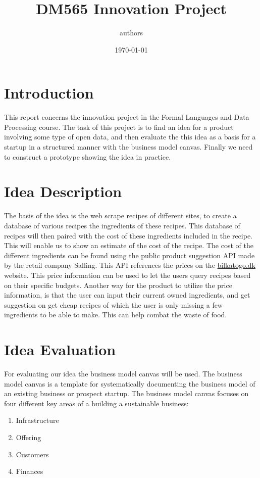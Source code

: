 \documentclass{article}
\title{DM565 Innovation Project}
\author{authors}
\date{\today}
\begin{document}
\maketitle

\newpage

\tableofcontents

\newpage

\section{Introduction}
This report concerns the innovation project in the Formal Languages and Data Processing
course. The task of this project is to find an idea for a product involving some type of
open data, and then  evaluate the this idea as a
basis for a startup in a structured manner with the business model canvas.
Finally we need to construct a prototype showing the idea in practice. 
\section{Idea Description}
\begin{comment}
 we need to focus our idea, as discussed in the midwayseminar. The best is to have a core
idea that we focus on. 
\end{comment}
The basis of the idea is the web scrape recipes of different sites, to create a database
of various recipes the ingredients of these recipes. This database of recipes will then
paired with the cost of these ingredients included in the recipe. This will enable us to
show an estimate of the cost of the recipe. The cost of the different ingredients can be
found using the public product suggestion API made by the retail company Salling. This API
references the prices on the \url{bilkatogo.dk} website. This price information can be
used to let the users query recipes based on their specific budgets. Another way for the
product to utilize the price information, is that the user can input their current owned
ingredients, and get suggestion on get cheap recipes of which the user is only missing a
few ingredients to be able to make. This can help combat the waste of food.


\section{Idea Evaluation}

For evaluating our idea the business model canvas will be used. The business model canvas
is a template for systematically documenting the business model of an existing business or
prospect startup. The business model canvas focuses on four different key areas of a
building a sustainable business: \begin{enumerate}[itemsep=0pt]
  \item Infrastructure
  \item Offering
  \item Customers
  \item Finances
\end{enumerate}
\end{document}
